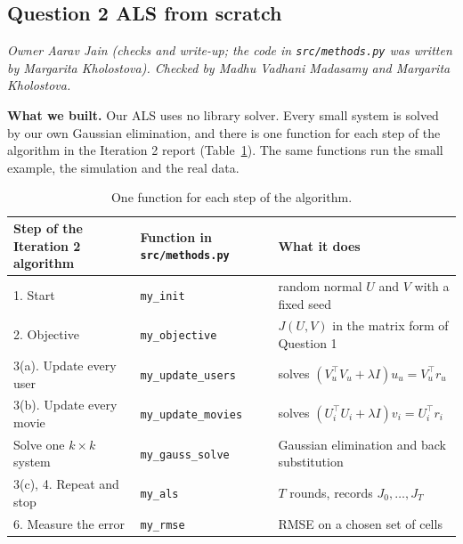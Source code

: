 
\subsection*{Question 2 ALS from scratch}
\textit{Owner Aarav Jain (checks and write-up; the code in \texttt{src/methods.py} was written by Margarita Kholostova). Checked by Madhu Vadhani Madasamy and Margarita Kholostova.}

\textbf{What we built.} Our ALS uses no library solver. Every small system is solved by our own Gaussian elimination, and there is one function for each step of the algorithm in the Iteration 2 report (Table~\ref{tab:functions}). The same functions run the small example, the simulation and the real data.

\begin{table}[h]
\centering
\small
\begin{tabular}{p{3.9cm}lp{6.2cm}}
\hline
Step of the Iteration 2 algorithm & Function in \texttt{src/methods.py} & What it does \\
\hline
1. Start & \texttt{my\_init} & random normal $U$ and $V$ with a fixed seed \\
2. Objective & \texttt{my\_objective} & $J(U,V)$ in the matrix form of Question 1 \\
3(a). Update every user & \texttt{my\_update\_users} & solves $(V_u^\top V_u + \lambda I)u_u = V_u^\top r_u$ \\
3(b). Update every movie & \texttt{my\_update\_movies} & solves $(U_i^\top U_i + \lambda I)v_i = U_i^\top r_i$ \\
Solve one $k \times k$ system & \texttt{my\_gauss\_solve} & Gaussian elimination and back substitution \\
3(c), 4. Repeat and stop & \texttt{my\_als} & $T$ rounds, records $J_0, \dots, J_T$ \\
6. Measure the error & \texttt{my\_rmse} & RMSE on a chosen set of cells \\
\hline
\end{tabular}
\caption{One function for each step of the algorithm.}
\label{tab:functions}
\end{table}

